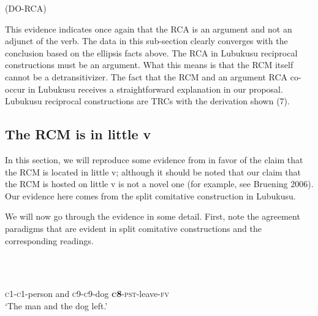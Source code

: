 \documentclass[output=paper]{langsci/langscibook}
\begin{document}
                      (DO-RCA)

This evidence indicates once again that the RCA is an argument and not an adjunct of the verb. The data in this sub-section clearly converges with the conclusion based on the ellipsis facts above. The RCA in Lubukusu reciprocal constructions must be an argument. What this means is that the RCM itself cannot be a detransitivizer. The fact that the RCM and an argument RCA co-occur in Lubukusu receives a straightforward explanation in our proposal. Lubukusu reciprocal constructions are TRCs with the derivation shown (7). 

\setcounter{listWWviiiNumxxviileveli}{0}
\begin{listWWviiiNumxxviileveli}
\item \setcounter{listWWviiiNumxxviilevelii}{0}
\begin{listWWviiiNumxxviilevelii}
\item \subsection{ The RCM is in little v}\end{listWWviiiNumxxviilevelii}
\end{listWWviiiNumxxviileveli}

In this section, we will reproduce some evidence from \citet{BakerEtAl2013} in favor of the claim that the RCM is located in little v; although it should be noted that our claim that the RCM is hosted on little v is not a novel one (for example, see Bruening 2006). Our evidence here comes from the split comitative construction in Lubukusu. 

  We will now go through the evidence in some detail. First, note the agreement paradigms that are evident in split comitative constructions and the corresponding readings. 

\setcounter{listWWviiiNumxlileveli}{0}
\begin{listWWviiiNumxlileveli}
\item \ea\label{ex:}
\\
\ea\label{ex:}
\\
\end{listWWviiiNumxlileveli}
       \textsc{c1-c1}{}-person   and  \textsc{c9-c9}{}-dog   \textbf{\textsc{c}}\textbf{8}{}-\textsc{pst}{}-leave-\textsc{fv} \\
\glt   ‘The man and the dog left.’
\z
\end{document}
